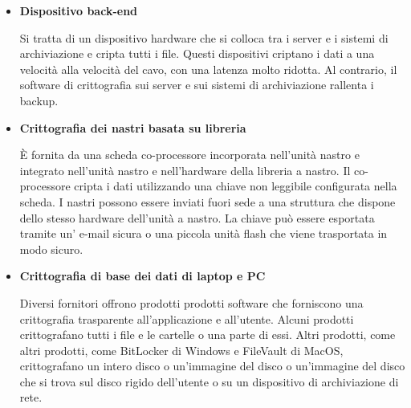 \begin{itemize}
    \item \textbf{Dispositivo back-end}
    
    Si tratta di un dispositivo hardware che si colloca tra i server e i sistemi di archiviazione e cripta tutti i file. Questi dispositivi criptano i dati a una velocità alla velocità del cavo, con una latenza molto ridotta. Al contrario, il software di crittografia sui server e sui sistemi di archiviazione rallenta i backup. 
    
    \item \textbf{Crittografia dei nastri basata su libreria}
    
    È fornita da una scheda co-processore incorporata nell'unità nastro e integrato nell'unità nastro e nell'hardware della libreria a nastro. Il co-processore cripta i dati utilizzando una chiave non leggibile configurata nella scheda. I nastri possono essere inviati fuori sede a una struttura che dispone dello stesso hardware dell'unità a nastro. La chiave può essere esportata tramite un' e-mail sicura o una piccola unità flash che viene trasportata in modo sicuro. 
    
    \item \textbf{Crittografia di base dei dati di laptop e PC}
    
    Diversi fornitori offrono prodotti prodotti software che forniscono una crittografia trasparente all'applicazione e all'utente. Alcuni prodotti crittografano tutti i file e le cartelle o una parte di essi. Altri prodotti, come altri prodotti, come BitLocker di Windows e FileVault di MacOS, crittografano un intero disco o un'immagine del disco o un'immagine del disco che si trova sul disco rigido dell'utente o su un dispositivo di archiviazione di rete.
\end{itemize}
